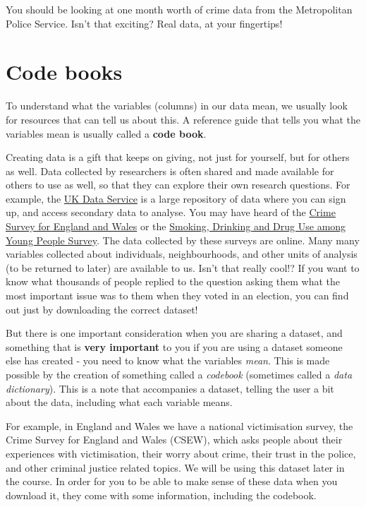 \documentclass[
]{book}
\begin{document}
You should be looking at one month worth of crime data from the Metropolitan Police Service. Isn't that exciting? Real data, at your fingertips!

\hypertarget{code-books}{%
\section{Code books}\label{code-books}}

To understand what the variables (columns) in our data mean, we usually look for resources that can tell us about this. A reference guide that tells you what the variables mean is usually called a \textbf{code book}.

Creating data is a gift that keeps on giving, not just for yourself, but for others as well. Data collected by researchers is often shared and made available for others to use as well, so that they can explore their own research questions. For example, the \href{https://www.ukdataservice.ac.uk/}{UK Data Service} is a large repository of data where you can sign up, and access secondary data to analyse. You may have heard of the \href{http://www.crimesurvey.co.uk/}{Crime Survey for England and Wales} or the \href{http://content.digital.nhs.uk/catalogue/PUB17879}{Smoking, Drinking and Drug Use among Young People Survey}. The data collected by these surveys are online. Many many variables collected about individuals, neighbourhoods, and other units of analysis (to be returned to later) are available to us. Isn't that really cool!? If you want to know what thousands of people replied to the question asking them what the most important issue was to them when they voted in an election, you can find out just by downloading the correct dataset!

But there is one important consideration when you are sharing a dataset, and something that is \textbf{very important} to you if you are using a dataset someone else has created - you need to know what the variables \emph{mean}. This is made possible by the creation of something called a \emph{codebook} (sometimes called a \emph{data dictionary}). This is a note that accompanies a dataset, telling the user a bit about the data, including what each variable means.

For example, in England and Wales we have a national victimisation survey, the Crime Survey for England and Wales (CSEW), which asks people about their experiences with victimisation, their worry about crime, their trust in the police, and other criminal justice related topics. We will be using this dataset later in the course. In order for you to be able to make sense of these data when you download it, they come with some information, including the codebook.
\end{document}
